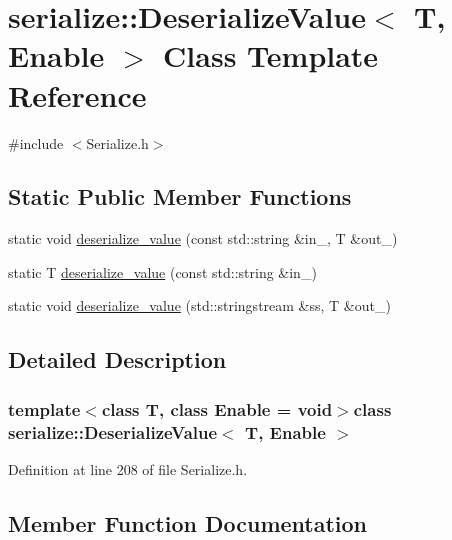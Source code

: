 \hypertarget{classserialize_1_1_deserialize_value}{}\section{serialize\+:\+:Deserialize\+Value$<$ T, Enable $>$ Class Template Reference}
\label{classserialize_1_1_deserialize_value}


{\ttfamily \#include $<$Serialize.\+h$>$}

\subsection*{Static Public Member Functions}
\begin{DoxyCompactItemize}
\item 
static void \hyperlink{classserialize_1_1_deserialize_value_ae086cfe3996b96c0a82785afe0af81b1}{deserialize\+\_\+value} (const std\+::string \&in\+\_\+, T \&out\+\_\+)
\item 
static T \hyperlink{classserialize_1_1_deserialize_value_a21e43fbca0d7f3774e4529436df072de}{deserialize\+\_\+value} (const std\+::string \&in\+\_\+)
\item 
static void \hyperlink{classserialize_1_1_deserialize_value_a85960dc8ca3587ca9c275c0deb679bb7}{deserialize\+\_\+value} (std\+::stringstream \&ss, T \&out\+\_\+)
\end{DoxyCompactItemize}


\subsection{Detailed Description}
\subsubsection*{template$<$class T, class Enable = void$>$class serialize\+::\+Deserialize\+Value$<$ T, Enable $>$}



Definition at line 208 of file Serialize.\+h.



\subsection{Member Function Documentation}
\hypertarget{classserialize_1_1_deserialize_value_ae086cfe3996b96c0a82785afe0af81b1}{}
